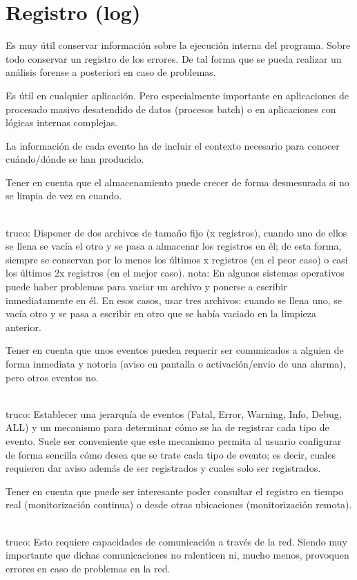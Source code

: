 \documentclass[spanish,12pt,a4paper,final,oneside]{book}
\begin{document}
\section{Registro (log)}
Es muy útil conservar información sobre la ejecución interna del programa. Sobre todo conservar un registro de los errores. De tal forma que se pueda realizar un análisis forense a posteriori en caso de problemas.

Es útil en cualquier aplicación. Pero especialmente importante en aplicaciones de procesado masivo desatendido de datos (procesos batch) o en aplicaciones con lógicas internas complejas.

La información de cada evento ha de incluir el contexto necesario para conocer cuándo/dónde se han producido.

Tener en cuenta que el almacenamiento puede crecer de forma desmesurada si no se limpia de vez en cuando. 
\begin{footnotesize}
\\truco: Disponer de dos archivos de tamaño fijo (x registros), cuando uno de ellos se llena se vacía el otro y se pasa a almacenar los registros en él; de esta forma, siempre se conservan por lo menos los últimos x registros (en el peor caso) o casi los últimos 2x registros (en el mejor caso). nota: En algunos sistemas operativos puede haber problemas para vaciar un archivo y ponerse a escribir inmediatamente en él. En esos casos, usar tres archivos: cuando se llena uno, se vacía otro y se pasa a escribir en otro que se había vaciado en la limpieza anterior.
\end{footnotesize}

Tener en cuenta que unos eventos pueden requerir ser comunicados a alguien de forma inmediata y notoria (aviso en pantalla o activación/envio de una alarma), pero otros eventos no. 
\begin{footnotesize}
\\truco: Establecer una jerarquía de eventos (Fatal, Error, Warning, Info, Debug, ALL) y un mecanismo para determinar cómo se ha de registrar cada tipo de evento. Suele ser conveniente que este mecanismo permita al usuario configurar de forma sencilla cómo desea que se trate cada tipo de evento; es decir, cuales requieren dar aviso además de ser registrados y cuales solo ser registrados.
\end{footnotesize}

Tener en cuenta que puede ser interesante poder consultar el registro en tiempo real (monitorización continua) o desde otras ubicaciones (monitorización remota).
\begin{footnotesize}
\\truco: Esto requiere capacidades de comunicación a través de la red. Siendo muy importante que dichas comunicaciones no ralenticen ni, mucho menos, provoquen errores en caso de problemas en la red.
\end{footnotesize}
\end{document}
